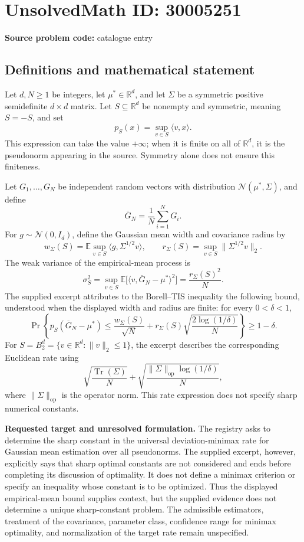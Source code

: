 \documentclass[11pt]{article}
\newcommand{\R}{\mathbb{R}}
\newcommand{\E}{\mathbb{E}}
\begin{document}
\section*{UnsolvedMath ID: 30005251}
\textbf{Source problem code:} catalogue entry
\subsection{Definitions and mathematical statement}
Let \(d,N\geq 1\) be integers, let \(\mu^*\in\R^d\), and let \(\Sigma\) be a symmetric positive semidefinite \(d\times d\) matrix. Let \(S\subseteq\R^d\) be nonempty and symmetric, meaning \(S=-S\), and set
\[
 p_S(x)=\sup_{v\in S}\langle v,x\rangle.
\]
This expression can take the value \(+\infty\); when it is finite on all of \(\R^d\), it is the pseudonorm appearing in the source. Symmetry alone does not ensure this finiteness.

Let \(G_1,\ldots,G_N\) be independent random vectors with distribution \(\mathcal N(\mu^*,\Sigma)\), and define
\[
 \overline G_N=\frac1N\sum_{i=1}^N G_i.
\]
For \(g\sim\mathcal N(0,I_d)\), define the Gaussian mean width and covariance radius by
\[
 w_\Sigma(S)=\E\sup_{v\in S}\langle g,\Sigma^{1/2}v\rangle,
 \qquad
 r_\Sigma(S)=\sup_{v\in S}\|\Sigma^{1/2}v\|_2.
\]
The weak variance of the empirical-mean process is
\[
 \sigma_S^2
 =\sup_{v\in S}\E\bigl[\langle v,\overline G_N-\mu^*\rangle^2\bigr]
 =\frac{r_\Sigma(S)^2}{N}.
\]
The supplied excerpt attributes to the Borell--TIS inequality the following bound, understood when the displayed width and radius are finite: for every \(0<\delta<1\),
\[
 \Pr\!\left\{
 p_S(\overline G_N-\mu^*)
 \leq \frac{w_\Sigma(S)}{\sqrt N}
       +r_\Sigma(S)\sqrt{\frac{2\log(1/\delta)}{N}}
 \right\}\geq 1-\delta.
\]
For \(S=B_2^d=\{v\in\R^d:\|v\|_2\leq1\}\), the excerpt describes the corresponding Euclidean rate using
\[
 \sqrt{\frac{\operatorname{Tr}(\Sigma)}{N}}
 +\sqrt{\frac{\|\Sigma\|_{\mathrm{op}}\log(1/\delta)}{N}},
\]
where \(\|\Sigma\|_{\mathrm{op}}\) is the operator norm. This rate expression does not specify sharp numerical constants.

\textbf{Requested target and unresolved formulation.} The registry asks to determine the sharp constant in the universal deviation-minimax rate for Gaussian mean estimation over all pseudonorms. The supplied excerpt, however, explicitly says that sharp optimal constants are not considered and ends before completing its discussion of optimality. It does not define a minimax criterion or specify an inequality whose constant is to be optimized. Thus the displayed empirical-mean bound supplies context, but the supplied evidence does not determine a unique sharp-constant problem. The admissible estimators, treatment of the covariance, parameter class, confidence range for minimax optimality, and normalization of the target rate remain unspecified.
\end{document}
